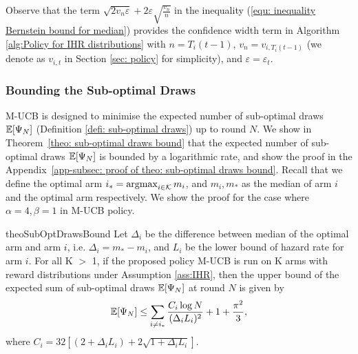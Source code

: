 Observe that the term $\sqrt{2 v_{n} \varepsilon}+2 \varepsilon \sqrt{\frac{v_{n}}{n}}$ in the inequality (\ref{equ: inequality Bernstein bound for median}) provides the confidence width term in Algorithm \ref{alg:Policy for IHR distributions} with $n = T_i(t-1)$, $v_n = v_{i,T_i(t-1)}$ (we denote as $v_{i,t}$ in Section \ref{sec: policy} for simplicity), and $\varepsilon = \varepsilon_t$.

\subsubsection{Bounding the Sub-optimal Draws}
\label{subsec: Bounding the Sub-optimal Draws}

M-UCB is designed to minimise the expected number of sub-optimal draws $\mathbb{E}[\Psi_N]$
(Definition \ref{defi: sub-optimal draws}) up to round $N$.
We show in Theorem~\ref{theo: sub-optimal draws bound} that the expected number
of sub-optimal draws $\mathbb{E}[\Psi_N]$ is bounded by a logarithmic rate,
and show the proof in the Appendix~\ref{app-subsec: proof of theo: sub-optimal draws bound}. Recall that we define the optimal arm $i_\ast = \operatorname*{argmax}_{i \in \mathcal{K}} m_i$, and $m_i, m_\ast$ as the median of arm $i$ and the optimal arm respectively. We show the proof for the case where $\alpha = 4, \beta =1$ in M-UCB policy.

\begin{restatable}{theo}{SubOptDrawsBound}
\label{theo: sub-optimal draws bound}
Let $\Delta_i$ be the difference between median of the optimal arm and arm $i$,
i.e. $\Delta_{i} = m_\ast - m_i$, and $L_i$ be the lower bound of hazard rate for arm $i$.
For all K $>$ 1, if the proposed policy M-UCB is run on K arms with reward distributions under Assumption \ref{ass:IHR},
then the upper bound of the expected sum of sub-optimal draws $\mathbb{E}[\Psi_N]$  at round $N$
is given by
\begin{align}
    \mathbb{E}[\Psi_N] \leq \sum_{i \neq i_\ast} \frac{ C_{i} \log N}{(\Delta_i L_{i})^2}  + 1 + \frac{\pi^2}{3},
\end{align}
where $C_{i} = 32[(2 + \Delta_i L_{i}) + 2\sqrt{1 +  \Delta_i L_{i}}]$. %
\end{restatable}

